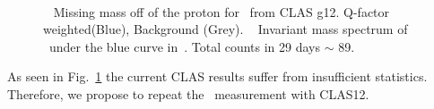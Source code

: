 	\begin{figure}[h!]\begin{center}
			\\
			\caption[Counts rates for \etaTP from g12]{\label{fig:g12figs}~ Missing mass off of the proton for \etaPDal \  from CLAS g12. Q-factor weighted(Blue), Background (Grey). ~ Invariant mass spectrum of \epemT \ under the blue curve in~. Total counts in 29 days $\sim$ 89.}
		\end{center}\end{figure}
		\FloatBarrier 	
		As seen in Fig.~\ref{fig:g12figs} the current CLAS results suffer from insufficient statistics. Therefore, we propose to repeat the \etaPDal \  measurement with CLAS12.
		\FloatBarrier